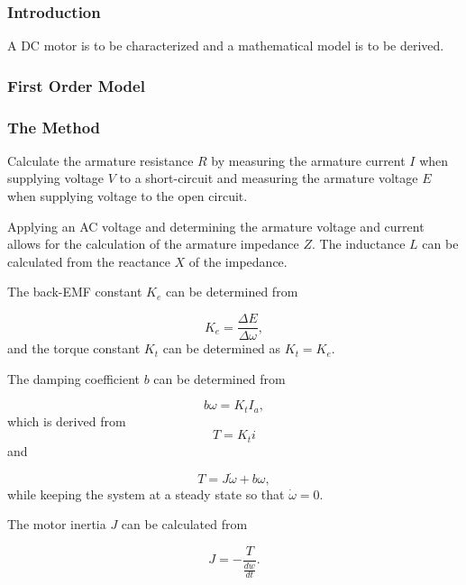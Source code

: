 \subsubsection{Introduction}\label{introduction}

A DC motor is to be characterized and a mathematical model is to be
derived.

\subsubsection{First Order Model}\label{first-order-model}

\subsubsection{The Method}\label{the-method}

Calculate the armature resistance $R$ by measuring the armature
current $I$ when supplying voltage $V$ to a short-circuit and
measuring the armature voltage $E$ when supplying voltage to the open
circuit.

Applying an AC voltage and determining the armature voltage and current
allows for the calculation of the armature impedance $Z$. The
inductance $L$ can be calculated from the reactance $X$ of the
impedance.

The back-EMF constant $K_e$ can be determined from

 \begin{equation} 
K_e = \frac{\Delta E}{\Delta\omega}, 
 \end{equation} 
 and the torque constant
$K_t$ can be determined as $K_t = K_e$.

The damping coefficient $b$ can be determined from

 \begin{equation} 
b\omega = K_tI_a, 
 \end{equation} 
 which is derived from 
 \begin{equation} 
T=K_ti
 \end{equation} 
 and

 \begin{equation} 
T = J\dot\omega +b\omega, 
 \end{equation} 
 while keeping the system at a steady
state so that $\dot\omega = 0$.

The motor inertia $J$ can be calculated from

 \begin{equation} 
J = -\frac{T}{\frac{dw}{dt}}.
 \end{equation} 


